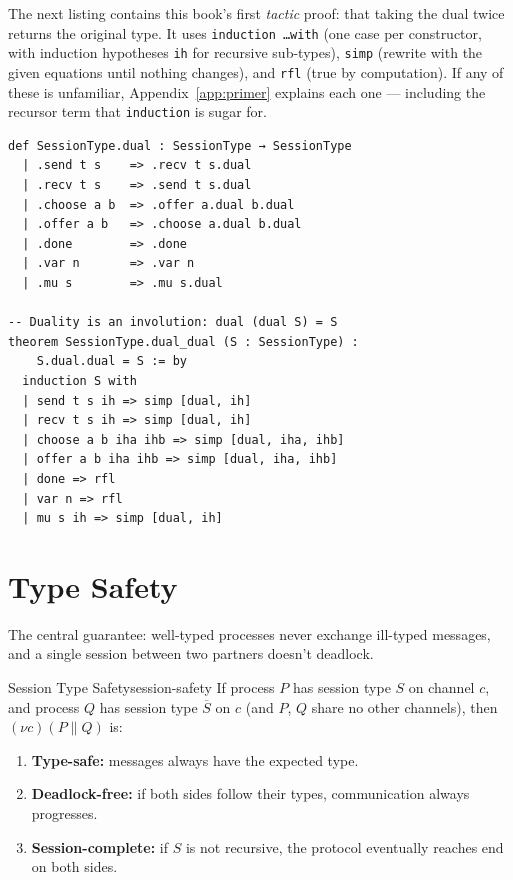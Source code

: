 \documentclass[11pt, a4paper, oneside]{book}
\newcommand{\Par}{\mathbin{\|}}
\newcommand{\res}[1]{(\nu #1)}
\newcommand{\lc}[1]{\texttt{#1}}
\begin{document}
The next listing contains this book's first \emph{tactic} proof: that taking
the dual twice returns the original type. It uses \lc{induction \ldots with}
(one case per constructor, with induction hypotheses \lc{ih} for recursive
sub-types), \lc{simp} (rewrite with the given equations until nothing
changes), and \lc{rfl} (true by computation). If any of these is unfamiliar,
Appendix~\ref{app:primer} explains each one --- including the recursor term
that \lc{induction} is sugar for.

\begin{leanbox}
\begin{verbatim}
def SessionType.dual : SessionType → SessionType
  | .send t s    => .recv t s.dual
  | .recv t s    => .send t s.dual
  | .choose a b  => .offer a.dual b.dual
  | .offer a b   => .choose a.dual b.dual
  | .done        => .done
  | .var n       => .var n
  | .mu s        => .mu s.dual

-- Duality is an involution: dual (dual S) = S
theorem SessionType.dual_dual (S : SessionType) :
    S.dual.dual = S := by
  induction S with
  | send t s ih => simp [dual, ih]
  | recv t s ih => simp [dual, ih]
  | choose a b iha ihb => simp [dual, iha, ihb]
  | offer a b iha ihb => simp [dual, iha, ihb]
  | done => rfl
  | var n => rfl
  | mu s ih => simp [dual, ih]
\end{verbatim}
\end{leanbox}

\section{Type Safety}

The central guarantee: well-typed processes never exchange ill-typed
messages, and a single session between two partners doesn't deadlock.

\begin{thm}{Session Type Safety}{session-safety}
If process $P$ has session type $S$ on channel $c$, and process $Q$ has
session type $\overline{S}$ on $c$ (and $P$, $Q$ share no other channels),
then $\res{c}(P \Par Q)$ is:
\begin{enumerate}[nosep, label=(\roman*)]
\item \textbf{Type-safe:} messages always have the expected type.
\item \textbf{Deadlock-free:} if both sides follow their types, communication
  always progresses.
\item \textbf{Session-complete:} if $S$ is not recursive, the protocol
  eventually reaches $\text{end}$ on both sides.
\end{enumerate}
\end{thm}
\end{document}
